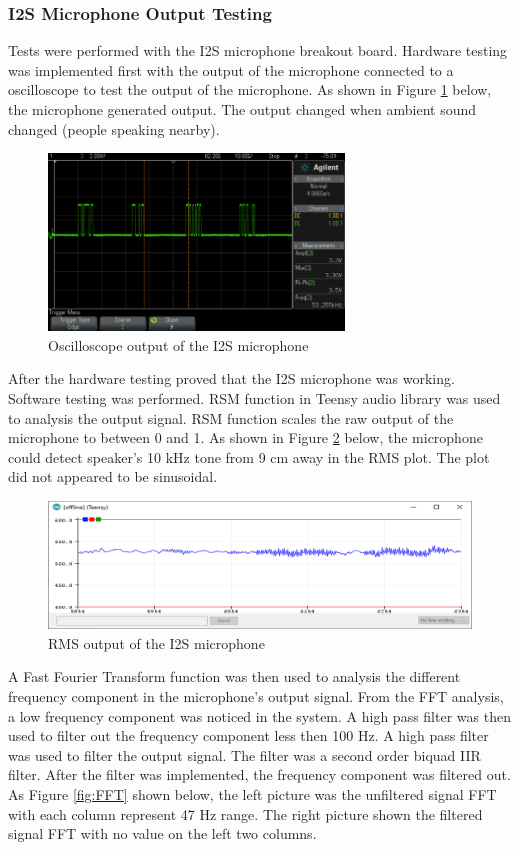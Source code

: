 \subsubsection{I2S Microphone Output Testing}
Tests were performed with the I2S microphone breakout board. Hardware testing was implemented first with the output of the microphone connected to a oscilloscope to test the output of the microphone. As shown in Figure \ref{fig:HardwareTest} below, the microphone generated output. The output changed when ambient sound changed (people speaking nearby). 
\begin{figure}[H]
	\centering
	\noindent\includegraphics[width=0.7\textwidth]{images/HardwareTest.png}
	\caption{Oscilloscope output of the I2S microphone}
	\label{fig:HardwareTest}
\end{figure}
After the hardware testing proved that the I2S microphone was working. Software testing was performed. RSM function in Teensy audio library was used to analysis the output signal. RSM function scales the raw output of the microphone to between 0 and 1. As shown in Figure \ref{fig:RSM} below, the microphone could detect speaker's 10 kHz tone from 9 cm away in the RMS plot. The plot did not appeared to be sinusoidal. 
\begin{figure}[H]
	\centering
	\noindent\includegraphics[width=1\textwidth]{images/RSM.png}
	\caption{RMS output of the I2S microphone}
	\label{fig:RSM}
\end{figure}
A Fast Fourier Transform function was then used to analysis the different frequency component in the microphone's output signal. From the FFT analysis, a low frequency component was noticed in the system. A high pass filter was then used to filter out the frequency component less then 100 Hz. A high pass filter was used to filter the output signal. The filter was a second order biquad IIR filter. After the filter was implemented, the frequency component was filtered out. As Figure \ref{fig:FFT} shown below, the left picture was the unfiltered signal FFT with each column represent 47 Hz range. The right picture shown the filtered signal FFT with no value on the left two columns. 

